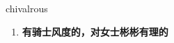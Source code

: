 
\begin{frame}
{\huge chivalrous}
\begin{center}
\begin{enumerate}\Large
  \item \textbf{有骑士风度的，对女士彬彬有理的}
\end{enumerate}
\end{center}
\end{frame}
